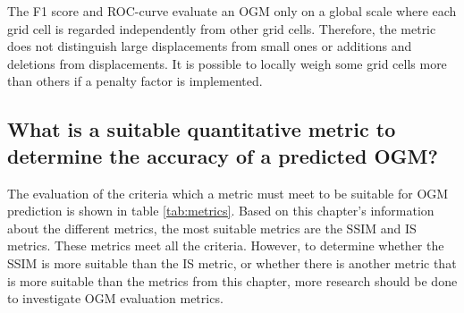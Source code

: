 The F1 score and \gls{ROC}-curve evaluate an \gls{OGM} only on a global scale where each grid cell is regarded independently from other grid cells. Therefore, the metric does not distinguish large displacements from small ones or additions and deletions from displacements. It is possible to locally weigh some grid cells more than others if a penalty factor is implemented.



\subsection{What is a suitable quantitative metric to determine the accuracy of a predicted \gls{OGM}?} \label{subsec:con_met}

The evaluation of the criteria which a metric must meet to be suitable for \gls{OGM} prediction is shown in table \ref{tab:metrics}. Based on this chapter's information about the different metrics, the most suitable metrics are the \gls{SSIM} and \gls{IS} metrics. These metrics meet all the criteria. However, to determine whether the \gls{SSIM} is more suitable than the \gls{IS} metric, or whether there is another metric that is more suitable than the metrics from this chapter, more research should be done to investigate \gls{OGM} evaluation metrics. 

